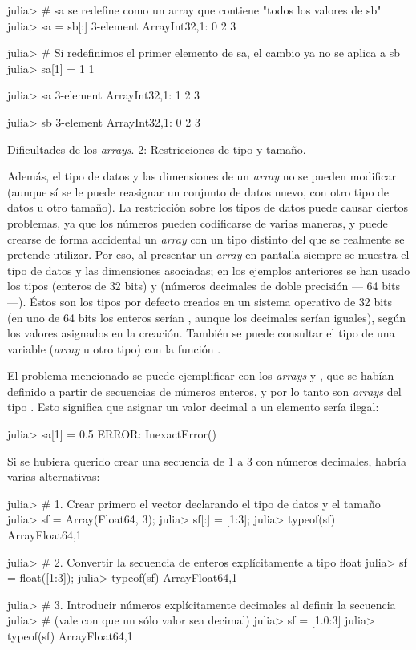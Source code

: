 ﻿\documentclass[spanish]{article}
\begin{document}
julia> # sa se redefine como un array que contiene "todos los valores de sb"
julia> sa = sb[:]
3-element Array{Int32,1}:
 0 2 3

julia> # Si redefinimos el primer elemento de sa, el cambio ya no se aplica a sb
julia> sa[1] = 1 1

julia> sa
3-element
Array{Int32,1}:
 1 2 3

julia> sb
3-element Array{Int32,1}:
 0 2 3

Dificultades de los \emph{arrays}. 2: Restricciones de tipo y tamaño.

Además, el tipo de datos y las dimensiones de un \emph{array} no se
pueden modificar (aunque sí se le puede reasignar un conjunto de datos
nuevo, con otro tipo de datos u otro tamaño). La restricción sobre
los tipos de datos puede causar ciertos problemas, ya que los números
pueden codificarse de varias maneras, y puede crearse de forma accidental
un \emph{array} con un tipo distinto del que se realmente se pretende
utilizar. Por eso, al presentar un \emph{array} en pantalla siempre
se muestra el tipo de datos y las dimensiones asociadas; en los ejemplos
anteriores se han usado los tipos  (enteros de 32 bits)
y  (números decimales de doble precisión --- 64 bits
---). Éstos son los tipos por defecto creados en un sistema operativo
de 32 bits (en uno de 64 bits los enteros serían , aunque
los decimales serían iguales), según los valores asignados en la creación.
También se puede consultar el tipo de una variable (\emph{array} u
otro tipo) con la función .

El problema mencionado se puede ejemplificar con los \emph{arrays}
 y , que se habían definido a partir de secuencias
de números enteros, y por lo tanto son \emph{arrays} del tipo .
Esto significa que asignar un valor decimal a un elemento sería ilegal:

julia> sa[1] = 0.5
ERROR: InexactError()

Si se hubiera querido crear una secuencia de 1 a 3 con números decimales,
habría varias alternativas:

julia> # 1. Crear primero el vector declarando el tipo de datos y el tamaño
julia> sf = Array(Float64, 3);
julia> sf[:] = [1:3];
julia> typeof(sf)
Array{Float64,1}

julia> # 2. Convertir la secuencia de enteros explícitamente a tipo float
julia> sf = float([1:3]);
julia> typeof(sf)
Array{Float64,1}

julia> # 3. Introducir números explícitamente decimales al definir la secuencia
julia> # (vale con que un sólo valor sea decimal)
julia> sf = [1.0:3]
julia> typeof(sf)
Array{Float64,1}
\end{document}
